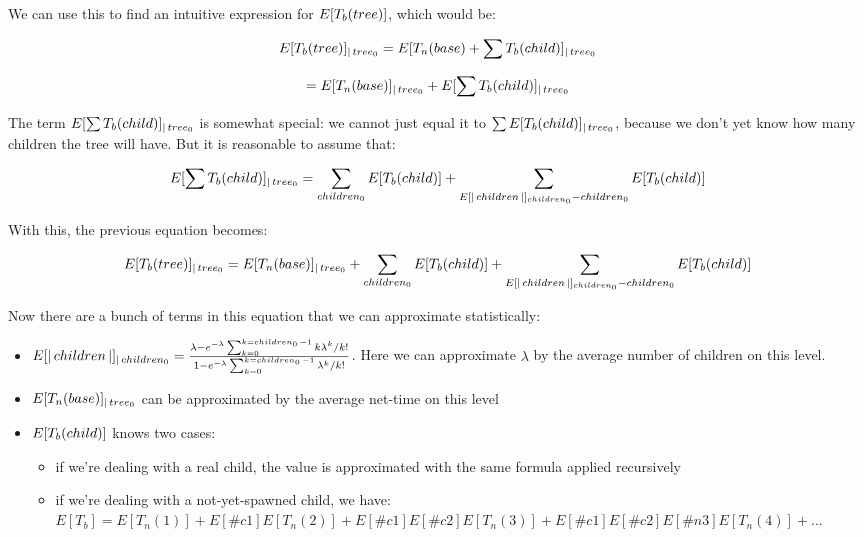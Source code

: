 We can use this to find an intuitive expression for $E[T_b(\mathop{tree})]$, which would be: 

$$ E[T_b(\mathop{tree})]_{| \mathop{tree}_0} = E[T_n(\mathop{base}) + \sum T_b(\mathop{child})]_{| \mathop{tree}_0} $$

$$ = E[T_n(\mathop{base})]_{| \mathop{tree}_0} + E[ \sum T_b(\mathop{child}) ]_{| \mathop{tree}_0} $$

The term $ E[ \sum T_b(\mathop{child}) ]_{| \mathop{tree}_0} $ is somewhat special: we cannot just equal it to $  \sum E[ T_b(\mathop{child}) ]_{|\mathop{tree}_0} $, because we don't yet know how many children the tree will have. But it is reasonable to assume that:

$$ E[ \sum T_b(\mathop{child}) ]_{| \mathop{tree}_0} = \sum_{children_0} E[T_b(\mathop{child})] + \sum_{E[|\mathop{children}|]_{ \mathop{children}_0} - \mathop{children}_0} E[T_b(\mathop{child})] $$

With this, the previous equation becomes: 

$$ E[T_b(\mathop{tree})]_{| \mathop{tree}_0} = E[T_n(\mathop{base})]_{| \mathop{tree}_0} +  \sum_{\mathop{children}_0} E[T_b(\mathop{child})] + \sum_{E[|\mathop{children}|]_{ \mathop{children}_0} - \mathop{children}_0} E[T_b(\mathop{child})] $$

Now there are a bunch of terms in this equation that we can approximate statistically: 

\begin{itemize}

    \item $ E[|\mathop{children}|]_{| \mathop{children}_0} = \frac{ \lambda - e^{-\lambda} \sum_{k=0}^{k=\mathop{children}_0 - 1} k \lambda^k / k! }{ 1 - e^{-\lambda} \sum_{k=0}^{k=\mathop{children}_0 - 1} \lambda^k / k! }  $. Here we can approximate $\lambda$ by the average number of children on this level.
    
    \item $ E[T_n(\mathop{base})]_{| \mathop{tree}_0} $ can be approximated by the average net-time on this level
    
    \item $ E[T_b(\mathop{child})] $ knows two cases: 
    
        \begin{itemize}
            
            \item if we're dealing with a real child, the value is approximated with the same formula applied recursively 
            
            \item if we're dealing with a not-yet-spawned child, we have: $ E[T_b] = E[T_n(1)] + E[\#c1] E[T_n(2)] + E[\#c1]E[\#c2]E[T_n(3)] + E[\#c1]E[\#c2]E[\#n3]E[T_n(4)] + ... $
        \end{itemize}

\end{itemize}


